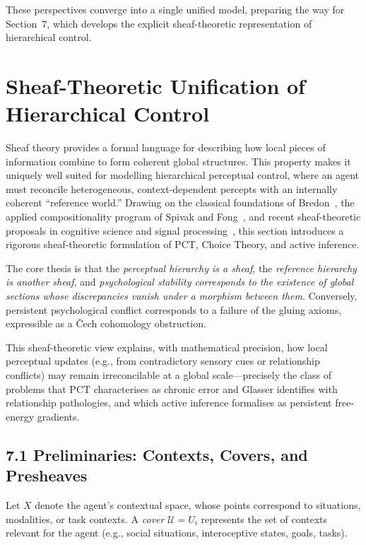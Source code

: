 \documentclass[11pt,a4paper,twoside]{article}
\begin{document}
These perspectives converge into a single unified model, preparing the way for Section~7,
which develops the explicit sheaf-theoretic representation of hierarchical control.

\section{Sheaf-Theoretic Unification of Hierarchical Control}

Sheaf theory provides a formal language for describing how local pieces of information combine to form coherent global structures. This property makes it uniquely well suited for modelling hierarchical perceptual control, where an agent must reconcile heterogeneous, context-dependent percepts with an internally coherent ``reference world.'' Drawing on the classical foundations of Bredon~\cite{bredon1997sheaf}, the applied compositionality program of Spivak and Fong~\cite{spivak2014category,fong2019invitation}, and recent sheaf-theoretic proposals in cognitive science and signal processing~\cite{curry2021sheafcomp,iverson2021sheaflearning,glazebrook2022,robinson2023sheaf}, this section introduces a rigorous sheaf-theoretic formulation of PCT, Choice Theory, and active inference.

The core thesis is that the \emph{perceptual hierarchy is a sheaf}, the \emph{reference hierarchy is another sheaf}, and \emph{psychological stability corresponds to the existence of global sections whose discrepancies vanish under a morphism between them}. Conversely, persistent psychological conflict corresponds to a failure of the gluing axioms, expressible as a \v{C}ech cohomology obstruction.

This sheaf-theoretic view explains, with mathematical precision, how local perceptual updates (e.g., from contradictory sensory cues or relationship conflicts) may remain irreconcilable at a global scale---precisely the class of problems that PCT characterises as chronic error and Glasser identifies with relationship pathologies, and which active inference formalises as persistent free-energy gradients.

\subsection{7.1 Preliminaries: Contexts, Covers, and Presheaves}

Let $X$ denote the agent's contextual space, whose points correspond to situations, modalities, or task contexts. A \emph{cover} $\mathcal{U}={U_i}$ represents the set of contexts relevant for the agent (e.g., social situations, interoceptive states, goals, tasks).
\end{document}
